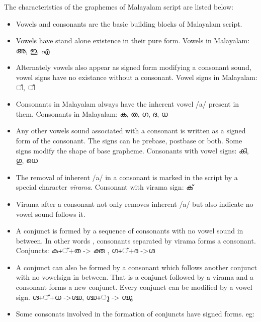 \documentclass[10pt]{article}
\begin{document}
The characteristics of  the graphemes of Malayalam script are listed below:

\begin{itemize}
\item
Vowels and consonants are the basic building blocks of Malayalam script. 
\item
 Vowels have stand alone existence in their pure form. Vowels in Malayalam: \begingroup \manjari അ, ഇ, എ \endgroup
\item
Alternately vowels also appear as signed form modifying a consonant sound, vowel signs have no existance  without a consonant.  Vowel signs in Malayalam: \begingroup \manjari  ി, ീ\endgroup
\item Consonants in Malayalam always have the inherent vowel /a/ present in them. Consonants in Malayalam: \begingroup \manjari  ക, ത, ഗ, ദ, ധ \endgroup
\item
 Any other vowels sound associated with a consonant is written as a signed form of the consonant. The signs can be prebase, postbase or both. Some signs modify the shape of base grapheme. Consonants with vowel signs:   \begingroup \manjari കി, ഗു, ധെ \endgroup 

\item
The removal of inherent /a/ in a consonant is marked in the script by a special character \textit{virama}.  Consonant with virama sign: \begingroup \manjari ക് \endgroup
\item
Virama after a consonant not only removes inherent /a/ but also indicate no vowel sound follows it. 
\item
A conjunct is formed by   a sequence of consonants with no vowel sound in between. In other words , consonants separated by virama forms a consonant. Conjuncts: \begingroup \manjari ക+്+ത -> ക്ത , ഗ+്+ദ ->ഗ്ദ \endgroup
\item
 A conjunct can also be formed by a consonant which follows another conjunct with no vowelsign in between. That is a conjunct followed by a virama and a consonant forms a new conjunct.  Every conjunct can be modified by a vowel sign.  \begingroup \manjari ഗ്ദ+്+ധ ->ഗ്ദ്ധ, ഗ്ദ്ധ+ു -> ഗ്ദ്ധു  \endgroup

\item
Some consonats involved in the formation of conjuncts have signed forms. eg: 
  
\end{itemize}


\paragraph{}
\end{document}
